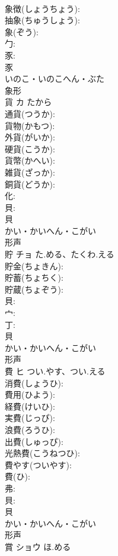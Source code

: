 \documentclass[8pt]{extreport}
\begin{document}
\begin{CJK}{UTF8}{min}
\\	象徴(しょうちょう): 
\\	抽象(ちゅうしょう): 
\\	象(ぞう): 
\\	勹: 
\\	豕: 
\\	豕	
\\	いのこ・いのこへん・ぶた	
\\	象形 
\\	貨	カ	たから		
\\	通貨(つうか): 
\\	貨物(かもつ): 
\\	外貨(がいか): 
\\	硬貨(こうか): 
\\	貨幣(かへい): 
\\	雑貨(ざっか): 
\\	銅貨(どうか): 
\\	化: 
\\	貝: 
\\	貝	
\\	かい・かいへん・こがい	
\\	形声 
\\	貯	チョ	た.める、たくわ.える		
\\	貯金(ちょきん): 
\\	貯蓄(ちょちく): 
\\	貯蔵(ちょぞう): 
\\	貝: 
\\	宀: 
\\	丁: 
\\	貝	
\\	かい・かいへん・こがい	
\\	形声 
\\	費	ヒ	つい.やす、つい.える		
\\	消費(しょうひ): 
\\	費用(ひよう): 
\\	経費(けいひ): 
\\	実費(じっぴ): 
\\	浪費(ろうひ): 
\\	出費(しゅっぴ): 
\\	光熱費(こうねつひ): 
\\	費やす(ついやす): 
\\	費(ひ): 
\\	弗: 
\\	貝: 
\\	貝	
\\	かい・かいへん・こがい	
\\	形声 
\\	賞	ショウ	ほ.める		

\end{CJK}
\end{document}

